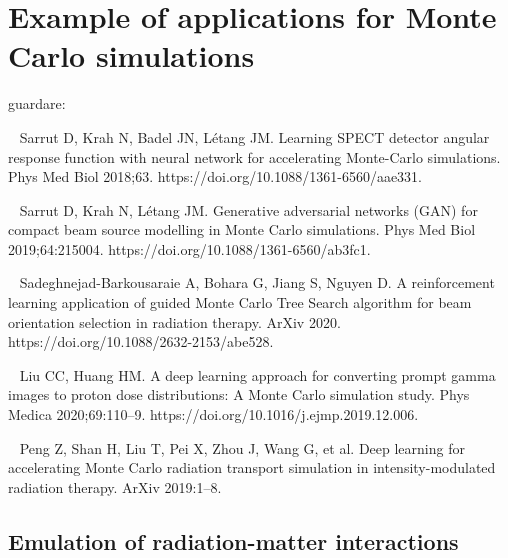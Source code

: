 \section{Example of applications for Monte Carlo simulations}
\label{sec:examples}


guardare:

~\cite{Sarrut2018} Sarrut D, Krah N, Badel JN, Létang JM. Learning SPECT detector angular response function with neural network for accelerating Monte-Carlo simulations. Phys Med Biol 2018;63. https://doi.org/10.1088/1361-6560/aae331.

~\cite{Sarrut2019}
Sarrut D, Krah N, Létang JM. Generative adversarial networks (GAN) for compact beam source modelling in Monte Carlo simulations. Phys Med Biol 2019;64:215004. https://doi.org/10.1088/1361-6560/ab3fc1.

~\cite{Sadeghnejad-Barkousaraie2020}
Sadeghnejad-Barkousaraie A, Bohara G, Jiang S, Nguyen D. A reinforcement learning application of guided Monte Carlo Tree Search algorithm for beam orientation selection in radiation therapy. ArXiv 2020. https://doi.org/10.1088/2632-2153/abe528.

~\cite{Liu2020a} 
Liu CC, Huang HM. A deep learning approach for converting prompt gamma images to proton dose distributions: A Monte Carlo simulation study. Phys Medica 2020;69:110–9. https://doi.org/10.1016/j.ejmp.2019.12.006.

~\cite{Peng2019}
Peng Z, Shan H, Liu T, Pei X, Zhou J, Wang G, et al. Deep learning for accelerating Monte Carlo radiation transport simulation in intensity-modulated radiation therapy. ArXiv 2019:1–8.


\subsection{Emulation of radiation-matter interactions}
\label{subsec:interactions}

